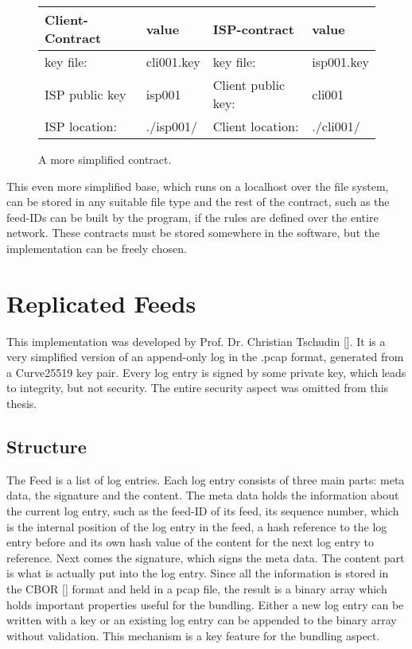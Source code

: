 \begin{figure}
    
    \begin{center}  
        \begin{tabular}{llll} \toprule
            Client-Contract&value&ISP-contract&value\\ \midrule
            key file:& cli001.key &  key file: &isp001.key  \\ 
            ISP public key&isp001&Client public key:&cli001\\
            ISP location:&.\slash isp001\slash &Client location:& .\slash cli001\slash \\\bottomrule
        \end{tabular}  
    \end{center}
    \caption{A more simplified contract.}
\end{figure}
This even more simplified base, which runs on a localhost over the file system, can be stored in any suitable file type and the rest of the contract, such as the feed-IDs can be built by the program, if the rules are defined over the entire network. These contracts must be stored somewhere in the software, but the implementation can be freely chosen.

\section{Replicated Feeds}
This implementation was developed by Prof. Dr. Christian Tschudin []. It is a very simplified version of an append-only log in the .pcap format, generated from a Curve25519 key pair. Every log entry is signed by some private key, which leads to integrity, but not security. The entire security aspect was omitted from this thesis.
\subsection{Structure}
The Feed is a list of log entries. Each log entry consists of three main parts: meta data, the signature and the content. The meta data holds the information about the current log entry, such as the feed-ID of its feed, its sequence number, which is the internal position of the log entry in the feed, a hash reference to the log entry before and its own hash value of the content for the next log entry to reference. Next comes the signature, which signs the meta data. The content part is what is actually put into the log entry. Since all the information is stored in the CBOR [] format and held in a pcap file, the result is a binary array which holds important properties useful for the bundling. Either a new log entry can be written with a key or an existing log entry can be appended to the binary array without validation. This mechanism is a key feature for the bundling aspect.
